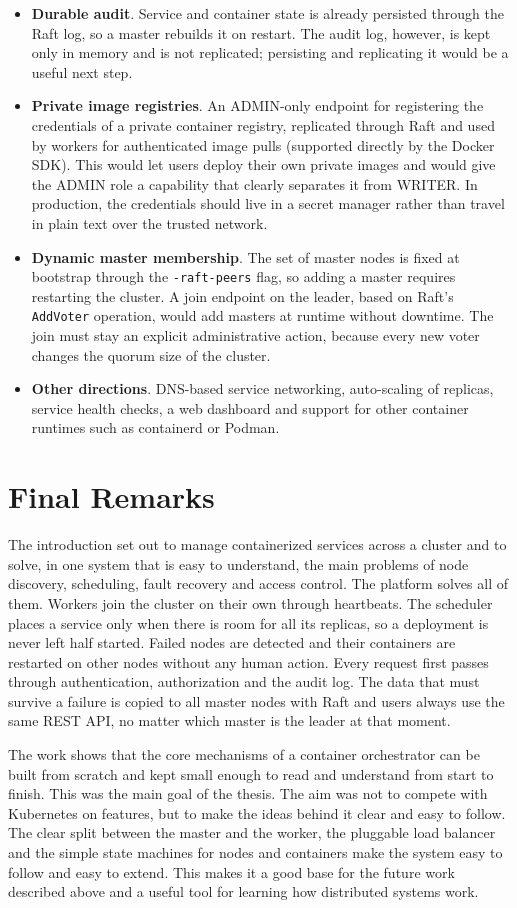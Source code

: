 \begin{itemize}
    \item \textbf{Durable audit}. Service and container state is already persisted through the Raft log, so a master rebuilds it on restart. The audit log, however, is kept only in memory and is not replicated; persisting and replicating it would be a useful next step.
    \item \textbf{Private image registries}. An ADMIN-only endpoint for registering the credentials of a private container registry, replicated through Raft and used by workers for authenticated image pulls (supported directly by the Docker SDK). This would let users deploy their own private images and would give the ADMIN role a capability that clearly separates it from WRITER. In production, the credentials should live in a secret manager rather than travel in plain text over the trusted network.
    \item \textbf{Dynamic master membership}. The set of master nodes is fixed at bootstrap through the \texttt{-raft-peers} flag, so adding a master requires restarting the cluster. A join endpoint on the leader, based on Raft's \texttt{AddVoter} operation, would add masters at runtime without downtime. The join must stay an explicit administrative action, because every new voter changes the quorum size of the cluster.
    \item \textbf{Other directions}. DNS-based service networking, auto-scaling of replicas, service health checks, a web dashboard and support for other container runtimes such as containerd or Podman.
\end{itemize}

\section{Final Remarks}

The introduction set out to manage containerized services across a cluster and to solve, in one system that is easy to understand, the main problems of node discovery, scheduling, fault recovery and access control. The platform solves all of them. Workers join the cluster on their own through heartbeats. The scheduler places a service only when there is room for all its replicas, so a deployment is never left half started. Failed nodes are detected and their containers are restarted on other nodes without any human action. Every request first passes through authentication, authorization and the audit log. The data that must survive a failure is copied to all master nodes with Raft and users always use the same REST API, no matter which master is the leader at that moment.

The work shows that the core mechanisms of a container orchestrator can be built from scratch and kept small enough to read and understand from start to finish. This was the main goal of the thesis. The aim was not to compete with Kubernetes on features, but to make the ideas behind it clear and easy to follow. The clear split between the master and the worker, the pluggable load balancer and the simple state machines for nodes and containers make the system easy to follow and easy to extend. This makes it a good base for the future work described above and a useful tool for learning how distributed systems work.